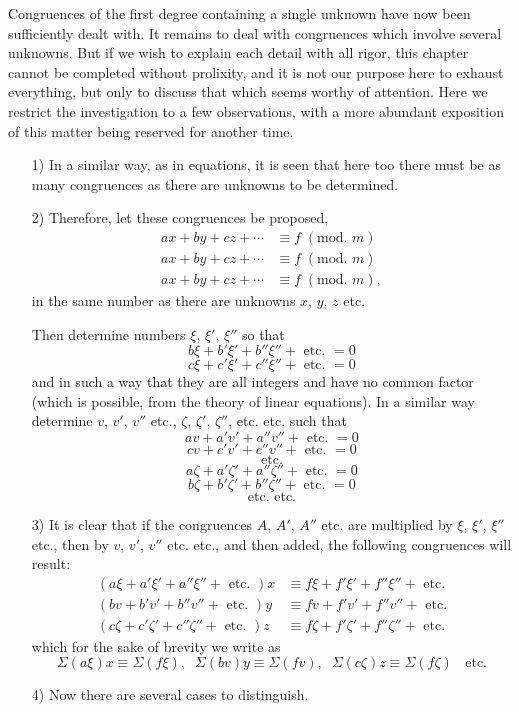 \documentclass{book}
\theoremstyle{plain}
\theoremstyle{remark}
\begin{document}
Congruences of the first degree containing a single unknown have now been sufficiently dealt with.   It remains to deal with congruences which involve several unknowns.   But if we wish to explain each detail with all rigor, this chapter cannot be completed without prolixity, and it is not our purpose here to exhaust everything, but only to discuss that which seems worthy of attention.   Here we restrict the investigation to a few observations, with a more abundant exposition of this matter being reserved for another time.
\begin{itemize}
\item[1)] In a similar way, as in equations, it is seen that here too there must be as many congruences as there are unknowns to be determined.
\item[2)] Therefore, let these congruences be proposed,
\begin{align} ax + by + cz + \cdots &\equiv f \; (\textrm{mod. }m)  \tag{A} \\
ax + by + cz + \cdots &\equiv f \; (\textrm{mod. }m) \tag{A'} \\
ax + by + cz + \cdots &\equiv f \; (\textrm{mod. }m), \tag{A''} \end{align}
in the same number as there are unknowns $x$, $y$, $z$ etc.

Then determine numbers $\xi$, $\xi'$, $\xi''$ so that 
\[ b \xi + b' \xi' + b'' \xi'' + \textrm{ etc. } = 0 \]
\[ c \xi + c' \xi' + c'' \xi'' + \textrm{ etc. } = 0 \] 
and in such a way that they are all integers and have no common factor (which is possible, from the theory of linear equations).  In a similar way determine $v$, $v'$, $v''$ etc., $\zeta$, $\zeta'$, $\zeta''$, etc. etc. such that
\[ a v + a' v' + a'' v'' + \textrm{ etc. } = 0 \]
\[ c v + c' v' + c'' v'' + \textrm{ etc. } = 0 \] 
\[ \textrm{ etc. }\]
\[ a \zeta + a' \zeta' + a'' \zeta'' + \textrm{ etc. } = 0 \]
\[ b \zeta + b' \zeta' + b'' \zeta'' + \textrm{ etc. } = 0 \] 
\[ \textrm{ etc. etc. }\]
\item[3)] It is clear that if the congruences $A$, $A'$, $A''$ etc. are multiplied by $\xi$, $\xi'$, $\xi''$ etc., then by $v$, $v'$, $v''$ etc. etc., and then added, the following congruences will result:
\begin{align} (a\xi + a'\xi' + a'' \xi'' + \textrm{ etc. }) x &\equiv f \xi + f'\xi' + f''\xi'' + \textrm{ etc.} \\
(bv + b'v' + b'' v'' + \textrm{ etc. }) y &\equiv f v + f'v' + f''v'' + \textrm{ etc.} \\
(c\zeta + c'\zeta' + c'' \zeta'' + \textrm{ etc. }) z &\equiv f \zeta + f'\zeta' + f''\zeta'' + \textrm{ etc.} \end{align}
which for the sake of brevity we write as 
\[ \Sigma(a\xi)x \equiv \Sigma(f\xi), \;\; \Sigma(bv)y \equiv \Sigma(fv), \; \; \Sigma(c\zeta)z \equiv \Sigma(f\zeta)  \; \; \textrm{ etc.} \]
\item[4)] Now there are several cases to distinguish.


\end{itemize}
\end{document}
